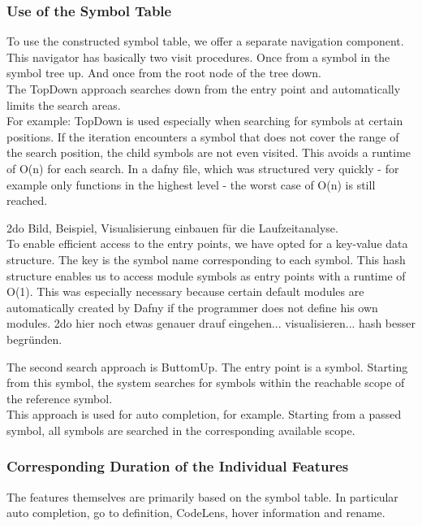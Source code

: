 \subsubsection{Use of the Symbol Table}
To use the constructed symbol table, we offer a separate navigation component.
This navigator has basically two visit procedures.
Once from a symbol in the symbol tree up. And once from the root node of the tree down. \\

The TopDown approach searches down from the entry point and automatically limits the search areas. \\

For example: TopDown is used especially when searching for symbols at certain positions.
If the iteration encounters a symbol that does not cover the range of the search position,
the child symbols are not even visited.
This avoids a runtime of O(n) for each search. In a dafny file, which was structured very quickly - for example only functions in the highest level - the worst case of O(n) is still reached.

2do Bild, Beispiel, Visualisierung einbauen für die Laufzeitanalyse. \\

To enable efficient access to the entry points, we have opted for a key-value data structure. The key is the symbol name corresponding to each symbol. This hash structure enables us to access module symbols as entry points with a runtime of O(1). This was especially necessary because certain default modules are automatically created by Dafny if the programmer does not define his own modules.
2do hier noch etwas genauer drauf eingehen... visualisieren... hash besser begründen.

The second search approach is ButtomUp.
The entry point is a symbol.
Starting from this symbol, the system searches for symbols within the reachable scope of the reference symbol. \\

This approach is used for auto completion, for example.
Starting from a passed symbol, all symbols are searched in the corresponding available scope.

\subsubsection{Corresponding Duration of the Individual Features}
The features themselves are primarily based on the symbol table.
In particular auto completion, go to definition, CodeLens, hover information and rename. \\

